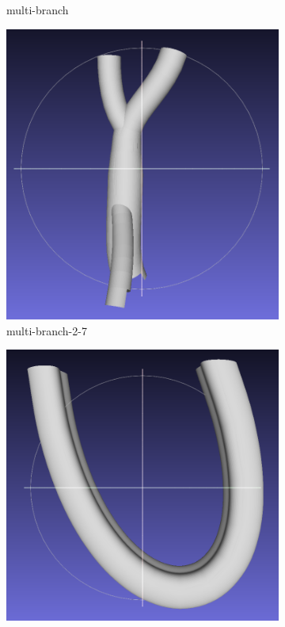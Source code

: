\documentclass[11p, titlepage]{article}
\begin{document}
\begin{figure}[h!]
\begin{subfigure}[b]{0.3\textwidth}
         \caption{multi-branch}
         \label{fig:multi_branch}
     \end{subfigure}
     \hfill
     \begin{subfigure}[b]{0.3\textwidth}
         \centering
         \includegraphics[width=\textwidth]{originals/multi-branch-2-7}
         \caption{multi-branch-2-7}
         \label{fig:multi_branch_focussed}
     \end{subfigure}
     \hfill
     \begin{subfigure}[b]{0.3\textwidth}
         \centering
         \includegraphics[width=\textwidth]{originals/bend}

\end{subfigure}
\end{figure}
\end{document}
